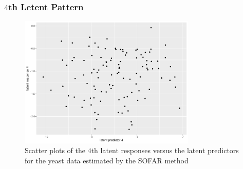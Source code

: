 \begin{frame} \frametitle{$4$th Letent Pattern}
    \begin{figure}[h]
        \centering
        \includegraphics[width=0.75\textwidth]{./figs/latent4.pdf}
        \caption{Scatter plots of the $4$th latent responses versus the latent predictors for the yeast data estimated by the SOFAR method}
    \end{figure}
\end{frame}

